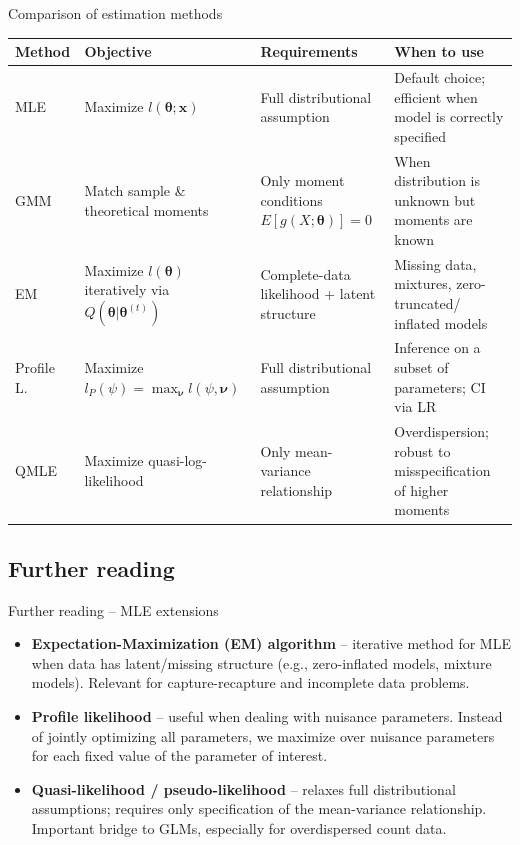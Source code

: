 \documentclass[10pt,ignorenonframetext,aspectratio=169]{beamer}
\begin{document}
\begin{frame}{Comparison of estimation methods}
\small
    \begin{table}[]
        \centering
        \begin{tabular}{p{1.5cm}p{2.5cm}p{2.5cm}p{3.5cm}}
        \hline
        \textbf{Method} & \textbf{Objective} & \textbf{Requirements} & \textbf{When to use} \\
        \hline
        MLE & Maximize $l(\boldsymbol{\theta}; \mathbf{x})$ & Full distributional assumption & Default choice; efficient when model is correctly specified \\[0.3cm]
        GMM & Match sample \& theoretical moments & Only moment conditions $E[g(X;\boldsymbol{\theta})]=0$ & When distribution is unknown but moments are known \\[0.3cm]
        EM & Maximize $l(\boldsymbol{\theta})$ iteratively via $Q(\boldsymbol{\theta}|\boldsymbol{\theta}^{(t)})$ & Complete-data likelihood + latent structure & Missing data, mixtures, zero-truncated/ inflated models \\[0.3cm]
        Profile L. & Maximize $l_P(\psi) = \max_{\boldsymbol{\nu}} l(\psi, \boldsymbol{\nu})$ & Full distributional assumption & Inference on a subset of parameters; CI via LR \\[0.3cm]
        QMLE & Maximize quasi-log-likelihood & Only mean-variance relationship & Overdispersion; robust to misspecification of higher moments \\
        \hline
        \end{tabular}
    \end{table}
\end{frame}

\subsection{Further reading}

\begin{frame}{Further reading -- MLE extensions}
\begin{itemize}
    \item \textbf{Expectation-Maximization (EM) algorithm} -- iterative method for MLE when data has latent/missing structure (e.g., zero-inflated models, mixture models). Relevant for capture-recapture and incomplete data problems.
    \item \textbf{Profile likelihood} -- useful when dealing with nuisance parameters. Instead of jointly optimizing all parameters, we maximize over nuisance parameters for each fixed value of the parameter of interest.
    \item \textbf{Quasi-likelihood / pseudo-likelihood} -- relaxes full distributional assumptions; requires only specification of the mean-variance relationship. Important bridge to GLMs, especially for overdispersed count data.
\end{itemize}
\end{frame}
\end{document}
